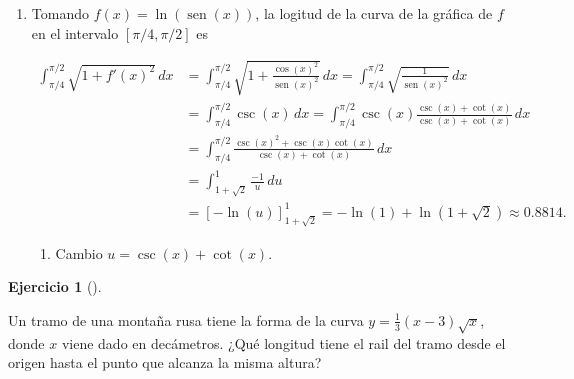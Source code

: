 \documentclass[
  spanish,
  a4paper,
]{scrreport}
\providecommand{\tightlist}{%
  \setlength{\itemsep}{0pt}\setlength{\parskip}{0pt}}
\theoremstyle{definition}
\newtheorem{exercise}{Ejercicio}[chapter]
\theoremstyle{remark}
\begin{document}
\begin{tcolorbox}
\begin{enumerate}
  Por tanto, por simetría, la longitud de la curva será el doble
  \(2\cdot 6.0607 = 12.1213\).
\item
  Tomando \(f(x)=\ln(\operatorname{sen}(x))\), la logitud de la curva de
  la gráfica de \(f\) en el intervalo \([\pi/4,\pi/2]\) es

  \begin{align*}
  \int_{\pi/4}^{\pi/2} \sqrt{1+f'(x)^2}\,dx 
  &= \int_{\pi/4}^{\pi/2} \sqrt{1+\frac{\cos(x)^2}{\operatorname{sen}(x)^2}}\, dx 
  = \int_{\pi/4}^{\pi/2} \sqrt{\frac{1}{\operatorname{sen}(x)^2}}\,dx \\
  &= \int_{\pi/4}^{\pi/2} \csc(x)\,dx 
  = \int_{\pi/4}^{\pi/2} \csc(x)\frac{\csc(x)+\cot(x)}{\csc(x)+\cot(x)}\,dx \\
  &= \int_{\pi/4}^{\pi/2} \frac{\csc(x)^2+\csc(x)\cot(x)}{\csc(x)+\cot(x)}\,dx \\
  &= \int_{1+\sqrt{2}}^1 \frac{-1}{u}\,du \tag{1}\\
  &= [-\ln(u)]_{1+\sqrt{2}}^1 = -\ln(1)+\ln(1+\sqrt{2}) \approx 0.8814. 
  \end{align*}

  \begin{enumerate}
  \def\labelenumii{(\arabic{enumii})}
  \tightlist
  \item
    Cambio \(u=\csc(x)+\cot(x)\).
  \end{enumerate}
\end{enumerate}

\end{tcolorbox}

\begin{exercise}[]\protect\hypertarget{exr-longitud-montaña-rusa}{}\label{exr-longitud-montaña-rusa}

Un tramo de una montaña rusa tiene la forma de la curva
\(y=\frac{1}{3}(x-3)\sqrt{x}\), donde \(x\) viene dado en decámetros.
¿Qué longitud tiene el rail del tramo desde el origen hasta el punto que
alcanza la misma altura?

\end{exercise}
\end{document}
